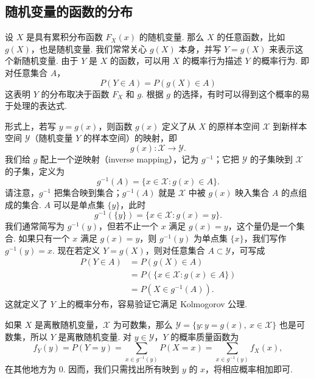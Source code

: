 \subsection{随机变量的函数的分布}\label{sec:2.1}
设 $X$ 是具有累积分布函数 $F_X(x)$ 的随机变量. 那么 $X$ 的任意函数，比如 $g(X)$，也是随机变量. 我们常常关心 $g(X)$ 本身，并写 $Y=g(X)$ 来表示这个新随机变量. 由于 $Y$ 是 $X$ 的函数，可以用 $X$ 的概率行为描述 $Y$ 的概率行为. 即对任意集合 $A$，
$$P(Y\in A)=P(g(X)\in A)$$
这表明 $Y$ 的分布取决于函数 $F_X$ 和 $g$. 根据 $g$ 的选择，有时可以得到这个概率的易于处理的表达式.

形式上，若写 $y=g(x)$，则函数 $g(x)$ 定义了从 $X$ 的原样本空间 $\mathscr X$ 到新样本空间 $\mathscr Y$（随机变量 $Y$ 的样本空间）的映射，即
$$g(x):\mathscr X\longrightarrow\mathscr Y.$$
我们给 $g$ 配上一个逆映射（inverse mapping），记为 $g^{-1}$；它把 $\mathscr Y$ 的子集映到 $\mathscr X$ 的子集，定义为
\begin{equation}\label{eq:2.1.1}
g^{-1}(A)=\{x\in\mathscr X:g(x)\in A\}.
\end{equation}
请注意，$g^{-1}$ 把集合映到集合；$g^{-1}(A)$ 就是 $\mathscr X$ 中被 $g(x)$ 映入集合 $A$ 的点组成的集合. $A$ 可以是单点集 $\{y\}$，此时
$$g^{-1}(\{y\})=\{x\in\mathscr X:g(x)=y\}.$$
我们通常简写为 $g^{-1}(y)$，但若不止一个 $x$ 满足 $g(x)=y$，这个量仍是一个集合. 如果只有一个 $x$ 满足 $g(x)=y$，则 $g^{-1}(y)$ 为单点集 $\{x\}$，我们写作 $g^{-1}(y)=x$. 现在若定义 $Y=g(X)$，则对任意集合 $A\subset\mathscr Y$，可写成
\begin{equation}\label{eq:2.1.2}
\begin{aligned}
P(Y\in A)&=P(g(X)\in A)\\
&=P(\{x\in\mathscr X:g(x)\in A\})\\
&=P(X\in g^{-1}(A)).
\end{aligned}
\end{equation}
这就定义了 $Y$ 上的概率分布，容易验证它满足 Kolmogorov 公理.

如果 $X$ 是离散随机变量，$\mathscr X$ 为可数集，那么 $\mathscr Y=\{y:y=g(x),\ x\in\mathscr X\}$ 也是可数集，所以 $Y$ 是离散随机变量. 对 $y\in\mathscr Y$，$Y$ 的概率质量函数为
$$
f_Y(y)=P(Y=y)=\sum_{x\in g^{-1}(y)}P(X=x)
=\sum_{x\in g^{-1}(y)}f_X(x),
$$
在其他地方为 $0$. 因而，我们只需找出所有映到 $y$ 的 $x$，将相应概率相加即可.

